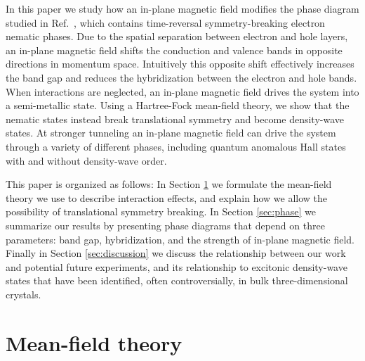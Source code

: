 \documentclass[reprint,aps,superscriptaddress]{revtex4-2}
\begin{document}
In this paper we study how an in-plane magnetic field modifies the phase diagram studied in Ref.~,
which contains time-reversal symmetry-breaking electron nematic phases.  Due to the spatial separation between electron and hole layers, an in-plane magnetic field shifts the conduction and valence bands in opposite directions in momentum space. 
Intuitively this opposite shift effectively increases the band gap and reduces the hybridization between the electron and hole bands.
When interactions are neglected, an in-plane magnetic field drives the system into a semi-metallic state.
Using a Hartree-Fock mean-field theory, we show that the nematic states instead break translational symmetry and become density-wave states.  At stronger tunneling an in-plane magnetic field can
drive the system through a variety of different phases, including quantum anomalous Hall states with and without
density-wave order.  

This paper is organized as follows: In Section \ref{sec:mft} we formulate the mean-field theory we use to describe interaction effects, 
and explain how we allow the possibility of translational symmetry breaking. 
In Section \ref{sec:phase} we summarize our results by presenting phase diagrams 
that depend on three parameters: band gap, hybridization, and the strength of in-plane magnetic field. 
Finally in Section \ref{sec:discussion} we discuss the relationship between our work and potential 
future experiments, and its relationship to excitonic density-wave states that have been identified, 
often controversially, in bulk three-dimensional crystals.  

\section{Mean-field theory} \label{sec:mft}
\end{document}
